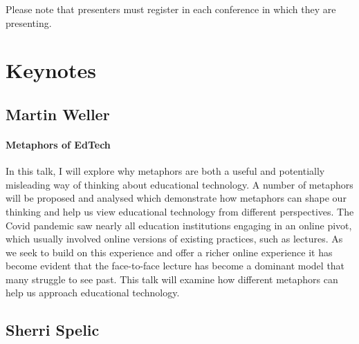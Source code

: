 \documentclass[
]{book}
\begin{document}
Please note that presenters must register in each conference in which they are presenting.

\hypertarget{keynotes}{%
\chapter*{Keynotes}\label{keynotes}}

\hypertarget{martin-weller}{%
\section*{Martin Weller}\label{martin-weller}}

\begin{reflect}
\hypertarget{metaphors-of-edtech}{%
\subsubsection{Metaphors of EdTech}\label{metaphors-of-edtech}}

In this talk, I will explore why metaphors are both a useful and
potentially misleading way of thinking about educational technology. A
number of metaphors will be proposed and analysed which demonstrate how
metaphors can shape our thinking and help us view educational technology
from different perspectives. The Covid pandemic saw nearly all education
institutions engaging in an online pivot, which usually involved online
versions of existing practices, such as lectures. As we seek to build on
this experience and offer a richer online experience it has become
evident that the face-to-face lecture has become a dominant model that
many struggle to see past. This talk will examine how different
metaphors can help us approach educational technology.
\end{reflect}

\hypertarget{sherri-spelic}{%
\section*{Sherri Spelic}\label{sherri-spelic}}
\end{document}
